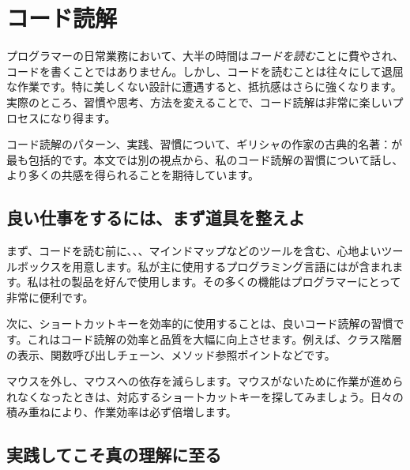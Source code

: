 \chapter{コード読解} 
\label{ch:code-reading}

\begin{content}

プログラマーの日常業務において、大半の時間は\emph{コードを読む}ことに費やされ、コードを書くことではありません。しかし、コードを読むことは往々にして退屈な作業です。特に美しくない設計に遭遇すると、抵抗感はさらに強くなります。実際のところ、習慣や思考、方法を変えることで、コード読解は非常に楽しいプロセスになり得ます。

コード読解のパターン、実践、習慣について、ギリシャの作家の古典的名著：が最も包括的です。本文では別の視点から、私のコード読解の習慣について話し、より多くの共感を得られることを期待しています。

\end{content}

\section{良い仕事をするには、まず道具を整えよ}

\begin{content}

まず、コードを読む前に、、、マインドマップなどのツールを含む、心地よいツールボックスを用意します。私が主に使用するプログラミング言語にはが含まれます。私は社の製品を好んで使用します。その多くの機能はプログラマーにとって非常に便利です。

次に、ショートカットキーを効率的に使用することは、良いコード読解の習慣です。これはコード読解の効率と品質を大幅に向上させます。例えば、クラス階層の表示、関数呼び出しチェーン、メソッド参照ポイントなどです。

\begin{remark}
マウスを外し、マウスへの依存を減らします。マウスがないために作業が進められなくなったときは、対応するショートカットキーを探してみましょう。日々の積み重ねにより、作業効率は必ず倍増します。
\end{remark}

\end{content}

\section{実践してこそ真の理解に至る}

